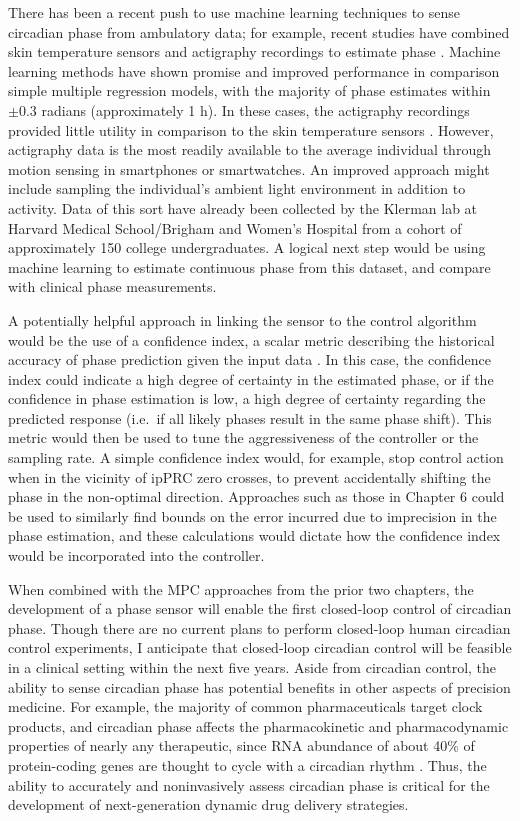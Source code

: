 There has been a recent push to use machine learning techniques to sense circadian phase from ambulatory data; for example, recent studies have combined skin temperature sensors and actigraphy recordings to estimate phase \cite{Kolodyazhniy2011, Kolodyazhniy2012}.
Machine learning methods have shown promise and improved performance in comparison simple multiple regression models, with the majority of phase estimates within $\pm0.3$ radians (approximately 1 h).
In these cases, the actigraphy recordings provided little utility in comparison to the skin temperature sensors \cite{Kolodyazhniy2012}.
However, actigraphy data is the most readily available to the average individual through motion sensing in smartphones or smartwatches.
An improved approach might include sampling the individual's ambient light environment in addition to activity.
Data of this sort have already been collected by the Klerman lab at Harvard Medical School/Brigham and Women's Hospital from a cohort of approximately 150 college undergraduates.
A logical next step would be using machine learning to estimate continuous phase from this dataset, and compare with clinical phase measurements.

A potentially helpful approach in linking the sensor to the control algorithm would be the use of a confidence index, a scalar metric describing the historical accuracy of phase prediction given the input data \cite{Laguna2017}.
In this case, the confidence index could indicate a high degree of certainty in the estimated phase, or if the confidence in phase estimation is low, a high degree of certainty regarding the predicted response (i.e.\ if all likely phases result in the same phase shift).
This metric would then be used to tune the aggressiveness of the controller or the sampling rate.
A simple confidence index would, for example, stop control action when in the vicinity of ipPRC zero crosses, to prevent accidentally shifting the phase in the non-optimal direction.
Approaches such as those in Chapter 6 could be used to similarly find bounds on the error incurred due to imprecision in the phase estimation, and these calculations would dictate how the confidence index would be incorporated into the controller.

When combined with the MPC approaches from the prior two chapters, the development of a phase sensor will enable the first closed-loop control of circadian phase.
Though there are no current plans to perform closed-loop human circadian control experiments, I anticipate that closed-loop circadian control will be feasible in a clinical setting within the next five years.
Aside from circadian control, the ability to sense circadian phase has potential benefits in other aspects of precision medicine.
For example, the majority of common pharmaceuticals target clock products, and circadian phase affects the pharmacokinetic and pharmacodynamic properties of nearly any therapeutic, since RNA abundance of about 40\% of protein-coding genes are thought to cycle with a circadian rhythm \cite{Zhang2014a}.
Thus, the ability to accurately and noninvasively assess circadian phase is critical for the development of next-generation dynamic drug delivery strategies.

